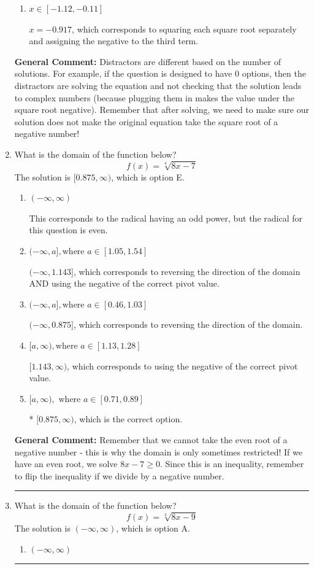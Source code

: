 \documentclass{extbook}[14pt]
\newcommand{\litem}[1]{\item #1

\rule{\textwidth}{0.4pt}}
\begin{document}
\begin{enumerate}
{\begin{enumerate}[label=\Alph*.]
This corresponds to believing the solution $x = 0.250$ leads to a complex value in the original equation.
\item \( x \in [-1.12,-0.11] \)

$x = -0.917$, which corresponds to squaring each square root separately and assigning the negative to the third term.
\end{enumerate}

\textbf{General Comment:} Distractors are different based on the number of solutions. For example, if the question is designed to have 0 options, then the distractors are solving the equation and not checking that the solution leads to complex numbers (because plugging them in makes the value under the square root negative). Remember that after solving, we need to make sure our solution does not make the original equation take the square root of a negative number!
}
\litem{
What is the domain of the function below?
\[ f(x) = \sqrt[4]{8 x - 7} \]The solution is \( [0.875, \infty) \), which is option E.\begin{enumerate}[label=\Alph*.]
\item \( (-\infty, \infty) \)

This corresponds to the radical having an odd power, but the radical for this question is even.
\item \( (-\infty, a], \text{where } a \in [1.05, 1.54] \)

$(-\infty, 1.143]$, which corresponds to reversing the direction of the domain AND using the negative of the correct pivot value.
\item \( (-\infty, a], \text{where } a \in [0.46, 1.03] \)

 $(-\infty, 0.875]$, which corresponds to reversing the direction of the domain.
\item \( [a, \infty), \text{where } a \in [1.13, 1.28] \)

$[1.143, \infty)$, which corresponds to using the negative of the correct pivot value.
\item \( [a, \infty), \text{ where } a \in [0.71, 0.89] \)

* $[0.875, \infty)$, which is the correct option.
\end{enumerate}

\textbf{General Comment:} Remember that we cannot take the even root of a negative number - this is why the domain is only sometimes restricted! If we have an even root, we solve $8 x - 7 \geq 0$. Since this is an inequality, remember to flip the inequality if we divide by a negative number.
}
\litem{
What is the domain of the function below?
\[ f(x) = \sqrt[3]{8 x - 9} \]The solution is \( (-\infty, \infty) \), which is option A.\begin{enumerate}[label=\Alph*.]
\item \( (-\infty, \infty) \)


\end{enumerate}}
\end{enumerate}
\end{document}
